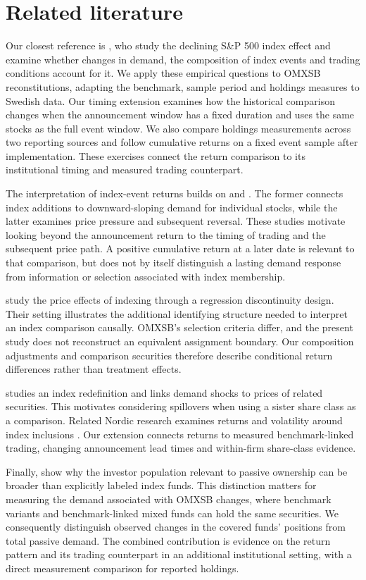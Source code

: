 \section{Related literature}

Our closest reference is \citet{greenwood2025}, who study the declining S\&P 500 index effect and examine whether changes in demand, the composition of index events and trading conditions account for it. We apply these empirical questions to OMXSB reconstitutions, adapting the benchmark, sample period and holdings measures to Swedish data. Our timing extension examines how the historical comparison changes when the announcement window has a fixed duration and uses the same stocks as the full event window. We also compare holdings measurements across two reporting sources and follow cumulative returns on a fixed event sample after implementation. These exercises connect the return comparison to its institutional timing and measured trading counterpart.

The interpretation of index-event returns builds on \citet{shleifer1986} and \citet{harris1986}. The former connects index additions to downward-sloping demand for individual stocks, while the latter examines price pressure and subsequent reversal. These studies motivate looking beyond the announcement return to the timing of trading and the subsequent price path. A positive cumulative return at a later date is relevant to that comparison, but does not by itself distinguish a lasting demand response from information or selection associated with index membership.

\citet{chang2015} study the price effects of indexing through a regression discontinuity design. Their setting illustrates the additional identifying structure needed to interpret an index comparison causally. OMXSB's selection criteria differ, and the present study does not reconstruct an equivalent assignment boundary. Our composition adjustments and comparison securities therefore describe conditional return differences rather than treatment effects.

\citet{greenwood2005} studies an index redefinition and links demand shocks to prices of related securities. This motivates considering spillovers when using a sister share class as a comparison. Related Nordic research examines returns and volatility around index inclusions \citep{feilberg2025}. Our extension connects returns to measured benchmark-linked trading, changing announcement lead times and within-firm share-class evidence.

Finally, \citet{chinco2024} show why the investor population relevant to passive ownership can be broader than explicitly labeled index funds. This distinction matters for measuring the demand associated with OMXSB changes, where benchmark variants and benchmark-linked mixed funds can hold the same securities. We consequently distinguish observed changes in the covered funds' positions from total passive demand. The combined contribution is evidence on the return pattern and its trading counterpart in an additional institutional setting, with a direct measurement comparison for reported holdings.
